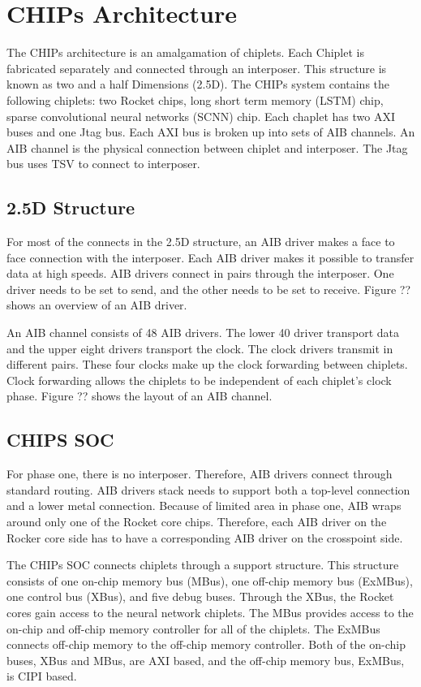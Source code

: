 \documentclass[../main.tex]{subfiles}
\begin{document}
\section{CHIPs Architecture}
The CHIPs architecture is an amalgamation of chiplets. Each Chiplet is fabricated separately and connected through an interposer. This structure is known as two and a half Dimensions (2.5D). The CHIPs system contains the following chiplets: two Rocket chips, long short term memory (LSTM) chip, sparse convolutional neural networks (SCNN) chip. Each chaplet has two AXI buses and one Jtag bus. Each AXI bus is broken up into sets of AIB channels. An AIB channel is the physical connection between chiplet and interposer. The Jtag bus uses TSV to connect to interposer.  

\subsection{2.5D Structure}
For most of the connects in the 2.5D structure, an AIB driver makes a face to face connection with the interposer. Each AIB driver makes it possible to transfer data at high speeds. AIB drivers connect in pairs through the interposer. One driver needs to be set to send, and the other needs to be set to receive. Figure ?? shows an overview of an AIB driver. 

An AIB channel consists of 48 AIB drivers.  The lower 40 driver transport data and the upper eight drivers transport the clock. The clock drivers transmit in different pairs. These four clocks make up the clock forwarding between chiplets. Clock forwarding allows the chiplets to be independent of each chiplet's clock phase. Figure ?? shows the layout of an AIB channel.

\subsection{CHIPS SOC}
For phase one, there is no interposer. Therefore, AIB drivers connect through standard routing. AIB drivers stack needs to support both a top-level connection and a lower metal connection.  Because of limited area in phase one, AIB wraps around only one of the Rocket core chips. Therefore, each AIB driver on the Rocker core side has to have a corresponding AIB driver on the crosspoint side.

The CHIPs SOC connects chiplets through a support structure. This structure consists of one on-chip memory bus (MBus), one off-chip memory bus (ExMBus), one control bus (XBus), and five debug buses.  Through the XBus, the Rocket cores gain access to the neural network chiplets. The MBus provides access to the on-chip and off-chip memory controller for all of the chiplets. The ExMBus connects off-chip memory to the off-chip memory controller.  Both of the on-chip buses, XBus and MBus, are AXI based, and the off-chip memory bus, ExMBus, is CIPI based. 
\end{document}
